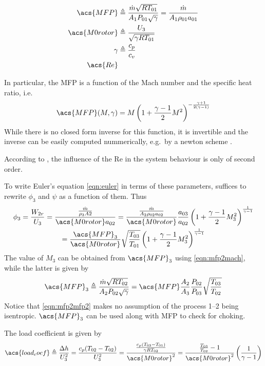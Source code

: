\documentclass[tcc]{subfiles}
\begin{document}
\begin{align}
    \acs{MFP} &\triangleq \MFP{1} = \MFPalt{1} \\
    \acs{M0rotor} &\triangleq \frac{U_3}{\sqrt{\gamma R T_{01}}} \\
    \gamma &\triangleq \frac{c_p}{c_v} \\
    \acs{Re} &
\end{align}

In particular, the \acl{MFP} is a function of the Mach number and the specific heat ratio,
 i.e.\
\begin{equation}
    \label{eqn:mfp2mach}
    \acs{MFP}(M,\gamma) = M \left( 1 + \frac{\gamma-1}{2}M^2\right)^{-\frac{\gamma+1}{2(\gamma-1)}}
\end{equation}
While there is no closed form inverse for this function, it is invertible and the inverse can be easily computed nummerically, e.g.\ by a newton scheme \cite{Der1974}.

According to \textcite{walsh2004gas},
 the influence of the \acl{Re} in the system behaviour is only of second order.

To write Euler's equation \cref{eqn:euler} in terms of these parameters, suffices to rewrite $\phi_3$ and $\psi$ as a function of them. Thus
\begin{multline}
    \label{eqn:phi2_dimensionless}
    \phi_3 = \frac{W_{2r}}{U_3} 
           = \frac{\frac{\dot{m}}{\rho_3 A2}}{\acs{M0rotor} a_{02}}
           = \frac{\MFPalt{2}}{\acs{M0rotor}} \frac{a_{03}}{a_{02}} \stagdensratio{3} \\ 
           = \frac{\acs{MFP}_3}{\acs{M0rotor}} \sqrt{\frac{T_{03}}{T_{01}}} \stagdensratio{3}
\end{multline}
The value of $M_3$ can be obtained from $\acs{MFP}_3$ using \cref{eqn:mfp2mach}, while the latter is given by
\begin{equation}
    \label{eqn:mfp2mfp2}
    \acs{MFP}_3 \triangleq \MFP{2} = \acs{MFP} \frac{A_2}{A_3} \frac{P_{02}}{P_{03}} \sqrt{\frac{T_{03}}{T_{02}}}
\end{equation}
Notice that \cref{eqn:mfp2mfp2} makes no assumption of the process 1--2 being isentropic. $\acs{MFP}_3$ can be used along with \acs{MFP} to check for choking.

The load coefficient is given by
\begin{equation}
    \acs{load_coef}\triangleq \frac{\Delta h}{U_3^2}
                      = \frac{c_p(T_{02}-T_{02})}{U_3^2}
                      = \frac{\frac{c_p(T_{03}-T_{01})}{\gamma R T_{02}}}
                                    {\acs{M0rotor}^2}
                      = \frac{\frac{T_{03}}{T_{02}}-1}
                                  {\acs{M0rotor}^2}
                        \left(\frac{1}{\gamma-1}\right)
\end{equation}
\end{document}
